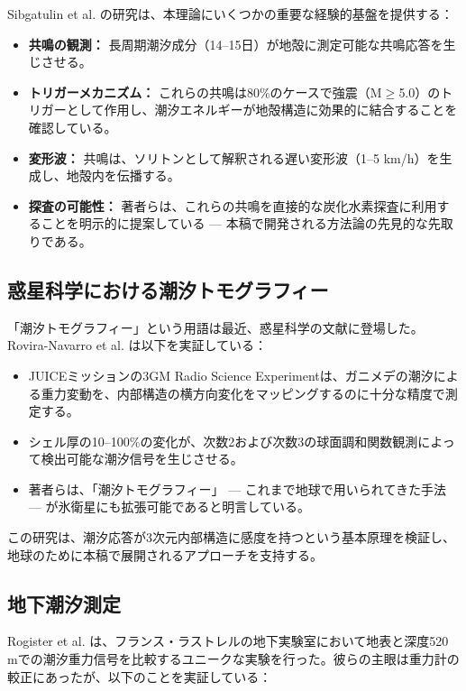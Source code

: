 \documentclass[12pt,a4paper]{article}
\theoremstyle{remark}
\begin{document}
	Sibgatulin et al. \cite{Sibgatulin2014} の研究は、本理論にいくつかの重要な経験的基盤を提供する：
	
	\begin{itemize}
		\item \textbf{共鳴の観測：} 長周期潮汐成分（14–15日）が地殻に測定可能な共鳴応答を生じさせる。
		\item \textbf{トリガーメカニズム：} これらの共鳴は80\%のケースで強震（M$\ge$5.0）のトリガーとして作用し、潮汐エネルギーが地殻構造に効果的に結合することを確認している。
		\item \textbf{変形波：} 共鳴は、ソリトンとして解釈される遅い変形波（1–5 km/h）を生成し、地殻内を伝播する。
		\item \textbf{探査の可能性：} 著者らは、これらの共鳴を直接的な炭化水素探査に利用することを明示的に提案している — 本稿で開発される方法論の先見的な先取りである。
	\end{itemize}
	
	\subsection{惑星科学における潮汐トモグラフィー}
	
	「潮汐トモグラフィー」という用語は最近、惑星科学の文献に登場した。Rovira-Navarro et al. \cite{RoviraNavarro2025} は以下を実証している：
	
	\begin{itemize}
		\item JUICEミッションの3GM Radio Science Experimentは、ガニメデの潮汐による重力変動を、内部構造の横方向変化をマッピングするのに十分な精度で測定する。
		\item シェル厚の10–100\%の変化が、次数2および次数3の球面調和関数観測によって検出可能な潮汐信号を生じさせる。
		\item 著者らは、「潮汐トモグラフィー」 — これまで地球で用いられてきた手法 — が氷衛星にも拡張可能であると明言している。
	\end{itemize}
	
	この研究は、潮汐応答が3次元内部構造に感度を持つという基本原理を検証し、地球のために本稿で展開されるアプローチを支持する。
	
	\subsection{地下潮汐測定}
	
	Rogister et al. \cite{Rogister2024} は、フランス・ラストレルの地下実験室において地表と深度520 mでの潮汐重力信号を比較するユニークな実験を行った。彼らの主眼は重力計の較正にあったが、以下のことを実証している：
	
\end{document}
